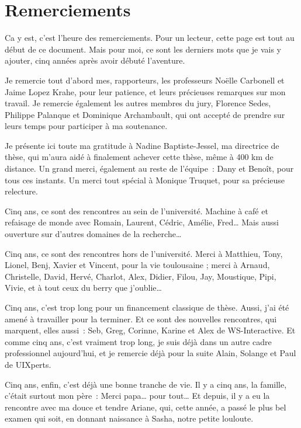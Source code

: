 \documentclass[
]{book}
\begin{document}
\hypertarget{remerciements}{%
\section*{Remerciements}\label{remerciements}}

Ca y est, c'est l'heure des remerciements. Pour un lecteur, cette page est
tout au début de ce document. Mais pour moi, ce sont les derniers mots que je
vais y ajouter, cinq années après avoir débuté l'aventure.

Je remercie tout d'abord mes, rapporteurs, les professeurs Noëlle Carbonell
et Jaime Lopez Krahe, pour leur patience, et leurs précieuses remarques sur
mon travail. Je remercie également les autres membres du jury, Florence
Sedes, Philippe Palanque et Dominique Archambault, qui ont accepté de prendre
sur leurs temps pour participer à ma soutenance.

Je présente ici toute ma gratitude à Nadine Baptiste-Jessel, ma directrice
de thèse, qui m'aura aidé à finalement achever cette thèse, même à 400 km de
distance. Un grand merci, également au reste de l'équipe~: Dany et Benoît,
pour tous ces instants. Un merci tout spécial à Monique Truquet, pour sa
précieuse relecture.

Cinq ans, ce sont des rencontres au sein de l'université. Machine à café
et refaisage de monde avec Romain, Laurent, Cédric, Amélie, Fred\ldots{} Mais
aussi ouverture sur d'autres domaines de la recherche\ldots{}

Cinq ans, ce sont des rencontres hors de l'université. Merci à Matthieu,
Tony, Lionel, Benj, Xavier et Vincent, pour la vie toulousaine ; merci à
Arnaud, Christelle, David, Hervé, Charlot, Alex, Didier, Filou, Jay,
Moustique, Pipi, Vivie, et à tout ceux du berry que j'oublie\ldots{}

Cinq ans, c'est trop long pour un financement classique de thèse. Aussi,
j'ai été amené à travailler pour la terminer. Et ce sont des nouvelles
rencontres, qui marquent, elles aussi~: Seb, Greg, Corinne, Karine et Alex de
WS-Interactive. Et comme cinq ans, c'est vraiment trop long, je suis déjà
dans un autre cadre professionnel aujourd'hui, et je remercie déjà pour la
suite Alain, Solange et Paul de UIXperts.

Cinq ans, enfin, c'est déjà une bonne tranche de vie. Il y a cinq ans, la
famille, c'était surtout mon père~: Merci papa\ldots{} pour tout\ldots{} Et depuis, il
y a eu la rencontre avec ma douce et tendre Ariane, qui, cette année, a passé
le plus bel examen qui soit, en donnant naissance à Sasha, notre petite
louloute.
\end{document}
